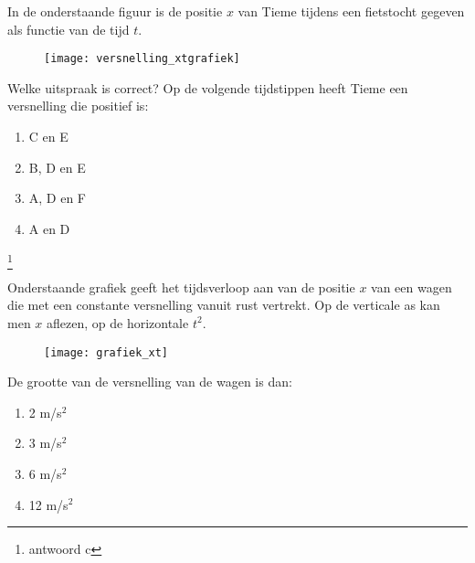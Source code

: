 \begin{exercise} In de onderstaande figuur is de positie $x$ van Tieme tijdens een fietstocht
gegeven als functie van de tijd $t$.
\begin{figure}[h]
\begin{center}
\texttt{[image: versnelling\_xtgrafiek]}
\end{center}
\end{figure}
\newline
Welke uitspraak is correct? Op de volgende tijdstippen heeft Tieme
een versnelling die positief is:
\begin{enumerate}
\item C en E
\item B, D en E
\item A, D en F
\item A en D
\end{enumerate}
\footnote{antwoord c}

\end{exercise}

\begin{exercise} Onderstaande grafiek geeft het
tijdsverloop aan van de positie $x$ van een wagen die met een
constante versnelling vanuit rust vertrekt. Op de verticale as kan
men $x$ aflezen, op de horizontale $t^2$.
\begin{figure}[h]
\begin{center}
\texttt{[image: grafiek\_xt]}
\end{center}
\end{figure}
\newline
De grootte van de versnelling van de wagen is dan:
\begin{enumerate}
\item 2 m/s$^2$
\item 3 m/s$^2$
\item 6 m/s$^2$
\item 12 m/s$^2$
\end{enumerate}



\end{exercise}

